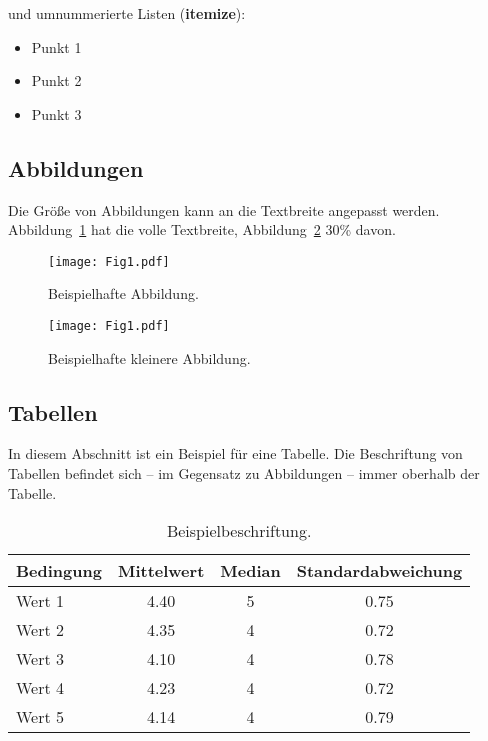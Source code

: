 und umnummerierte Listen (\textbf{itemize}):

\begin{itemize}
    \item Punkt 1
    \item Punkt 2
    \item Punkt 3
\end{itemize}


\subsection{Abbildungen}
\label{sec:figures}

Die Größe von Abbildungen kann an die Textbreite angepasst werden. Abbildung~\ref{fig:Fig1} hat die volle Textbreite, Abbildung~\ref{fig:Fig2} 30\% davon.

\begin{figure} [!htb]
  \centering
  \texttt{[image: Fig1.pdf]}
  \caption{Beispielhafte Abbildung.}
  \label{fig:Fig1}
\end{figure}


\begin{figure} [!htb]
  \centering
  \texttt{[image: Fig1.pdf]}
 \caption{Beispielhafte kleinere Abbildung.}
  \label{fig:Fig2}
\end{figure}

\subsection{Tabellen}
\label{sec:tables}

In diesem Abschnitt ist ein Beispiel für eine Tabelle. Die Beschriftung von Tabellen befindet sich -- im Gegensatz zu Abbildungen -- immer oberhalb der Tabelle.

\begin{table} [h]
\centering
\caption{Beispielbeschriftung.}
\label{tab:feedback}
\begin{tabular}{lccc}
\toprule
\textbf{Bedingung} & \textbf{Mittelwert} & \textbf{Median} & \textbf{Standardabweichung} \\
\midrule
Wert 1 & 4.40 & 5 & 0.75 \\
Wert 2 & 4.35 & 4 & 0.72 \\
Wert 3 & 4.10 & 4 & 0.78 \\
Wert 4 & 4.23 & 4 & 0.72 \\
Wert 5 & 4.14 & 4 & 0.79 \\
\bottomrule
\end{tabular}
\end{table}








